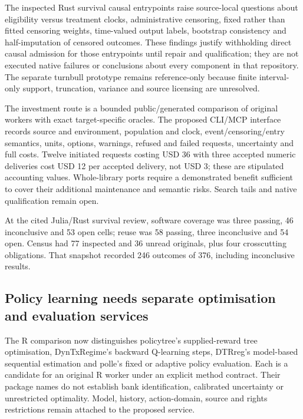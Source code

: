 The inspected Rust survival causal entrypoints raise source-local
questions about eligibility versus treatment clocks, administrative
censoring, fixed rather than fitted censoring weights, time-valued
output labels, bootstrap consistency and half-imputation of censored
outcomes. These findings justify withholding direct causal admission for
those entrypoints until repair and qualification; they are not executed
native failures or conclusions about every component in that repository.
The separate turnbull prototype remains reference-only because finite
interval-only support, truncation, variance and source licensing are
unresolved.
\citep{exec24_survivalother_rustcore,exec24_survivalother_rustturnbull}

The investment route is a bounded public/generated comparison of
original workers with exact target-specific oracles. The proposed
CLI/MCP interface records source and environment, population and clock,
event/censoring/entry semantics, units, options, warnings, refused and
failed requests, uncertainty and full costs. Twelve initiated requests
costing USD 36 with three accepted numeric deliveries cost USD 12 per
accepted delivery, not USD 3; these are stipulated accounting values.
Whole-library ports require a demonstrated benefit sufficient to cover
their additional maintenance and semantic risks. Search tails and native
qualification remain open. \citep{exec24_survivalother_reference}

At the cited Julia/Rust survival review, software coverage was three
passing, 46 inconclusive and 53 open cells; reuse was 58 passing, three
inconclusive and 54 open. Census had 77 inspected and 36 unread
originals, plus four crosscutting obligations. That snapshot recorded
246 outcomes of 376, including inconclusive results.
\citep{sp24survivalother_reader,sp24survivalother_progress}

\hypertarget{policy-learning-needs-separate-optimisation-and-evaluation-services}{%
\subsection{Policy learning needs separate optimisation and evaluation
services}\label{policy-learning-needs-separate-optimisation-and-evaluation-services}}

The R comparison now distinguishes policytree's supplied-reward tree
optimisation, DynTxRegime's backward Q-learning steps, DTRreg's
model-based sequential estimation and polle's fixed or adaptive policy
evaluation. Each is a candidate for an original R worker under an
explicit method contract. Their package names do not establish bank
identification, calibrated uncertainty or unrestricted optimality.
Model, history, action-domain, source and rights restrictions remain
attached to the proposed service.
\citep{exec24_policiesr_policytree,exec24_policiesr_dyntx,exec24_policiesr_dtrreg,exec24_policiesr_polle}

